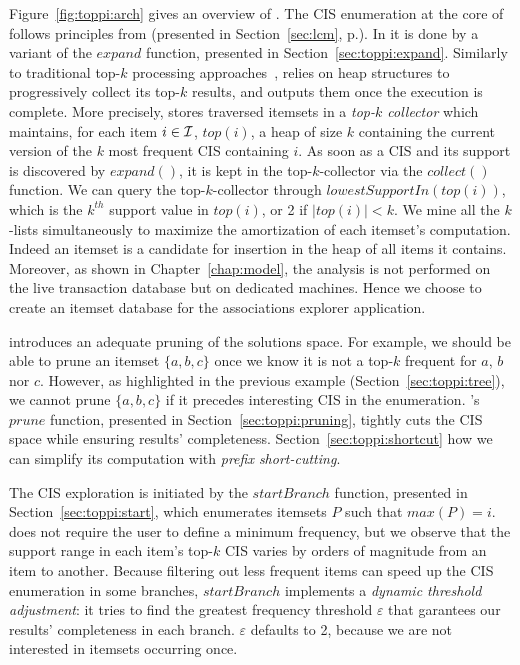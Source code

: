 Figure~\ref{fig:toppi:arch} gives an overview of \toppi.
The CIS enumeration at the core of
\toppi follows principles from \jlcm (presented in Section~\ref{sec:lcm}, p.\pageref{sec:lcm}).
In \toppi it is done by a variant of the $\mathit{expand}$ function,
presented in Section~\ref{sec:toppi:expand}.
Similarly to traditional top-$k$ processing approaches~\cite{FaginPODS01},
\toppi relies on heap structures to progressively collect its top-$k$ results,
and outputs them once the execution is complete.
More precisely, \toppi stores traversed itemsets in a \emph{top-$k$ collector} which maintains,
for each item $i\in{\cal I}$, $\mathit{top(i)}$,
a heap of size $k$ containing the current version of the $k$ most frequent CIS containing $i$.
As soon as a CIS and its support is discovered by $\mathit{expand}()$,
it is kept in the top-$k$-collector via the $\mathit{collect}()$ function.
We can query the top-$k$-collector through $\mathit{lowestSupportIn(top(i))}$,
which is the $k^{th}$ support value in $\mathit{top(i)}$, or 2 if $|\mathit{top(i)}|<k$.
We mine all the $k$-lists simultaneously to maximize the amortization of each itemset's computation.
Indeed an itemset is a candidate for insertion in the heap of all items it contains.
Moreover, as shown in Chapter~\ref{chap:model},
the analysis is not performed on the live transaction database but on dedicated machines.
Hence we choose to create an itemset database for the associations explorer application.

\toppi introduces an adequate pruning of the solutions space.
For example, we should be able to prune
an itemset $\{a,b,c\}$ once we know it is not a top-$k$ frequent for $a$, $b$ nor $c$.
However, as highlighted in the previous example (Section~\ref{sec:toppi:tree}),
we cannot prune $\{a,b,c\}$ if it precedes interesting CIS in the enumeration.
\toppi's $\mathit{prune}$ function, presented in Section~\ref{sec:toppi:pruning},
tightly cuts the CIS space while ensuring results' completeness.
Section~\ref{sec:toppi:shortcut} how we can simplify its computation with {\em prefix short-cutting}.

The CIS exploration is initiated by the $\mathit{startBranch}$ function,
presented in Section~\ref{sec:toppi:start},
which enumerates itemsets $P$ such that $\mathit{max}(P)=i$.
\toppi does not require the user to define a minimum frequency,
but we observe that the support range in each item's top-$k$ CIS varies by orders of magnitude from an item to another.
Because filtering out less frequent items can speed up the CIS enumeration in some branches,
$\mathit{startBranch}$ implements a {\em dynamic threshold adjustment}:
it tries to find the greatest frequency threshold $\varepsilon$
that garantees our results' completeness in each branch.
$\varepsilon$ defaults to 2, because we are not interested in itemsets occurring once.



